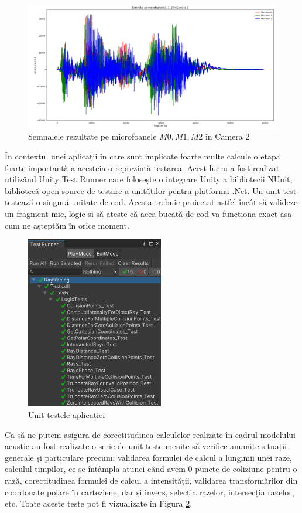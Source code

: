 	\begin{figure}[!htb]
		\centering
		\includegraphics[width=1\linewidth]{imagini/sound.png}
		\caption{Semnalele rezultate pe microfoanele $M0, M1, M2$ în Camera 2}
		\label{Fig25}
	\end{figure}
		
	În contextul unei aplicații în care sunt implicate foarte multe calcule o etapă foarte importantă a acesteia o reprezintă testarea. Acest lucru a fost realizat utilizând Unity Test Runner care folosește o integrare Unity a bibliotecii NUnit, bibliotecă open-source de testare a unităților pentru platforma .Net. Un unit test testează o singură unitate de cod. Acesta trebuie proiectat astfel încât să valideze un fragment mic, logic și să ateste că acea bucată de cod va funcționa exact așa cum ne așteptăm în orice moment.
	
	\begin{figure}[!htb]
		\centering
		\includegraphics[width=6cm]{imagini/teste1.png}
		\caption{Unit testele aplicației}
		\label{teste}
	\end{figure}
	
	Ca să ne putem asigura de corectitudinea calculelor realizate în cadrul modelului acustic au fost realizate o serie de unit teste menite să verifice anumite situații generale și particulare precum: validarea formulei de calcul a lungimii unei raze, calculul timpilor, ce se întâmpla atunci când avem 0 puncte de coliziune pentru o rază, corectitudinea formulei de calcul a intensității, validarea transformărilor din coordonate polare în carteziene, dar și invers, selecția razelor, intersecția razelor, etc. Toate aceste teste pot fi vizualizate în Figura \ref{teste}.
	
